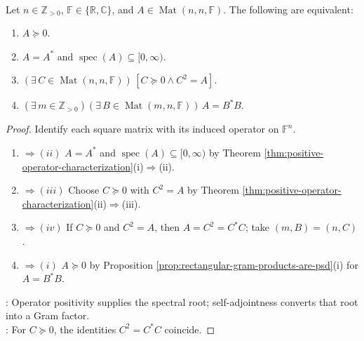 \begin{theorem} \label{thm:positive-semidefinite-matrix-equivalences} \\
Let $n\in\mathbb{Z}_{>0}$, $\mathbb{F}\in\{\mathbb{R},\mathbb{C}\}$, and $A\in\operatorname{Mat}(n,n,\mathbb{F})$. The following are equivalent:
\begin{enumerate}[label=(\roman*)]
\setlength{\itemsep}{0pt}
\item $A\succeq0$.
\item $A=A^*$ and $\operatorname{spec}(A)\subseteq[0,\infty)$.
\item $(\exists\,C\in\operatorname{Mat}(n,n,\mathbb{F}))\,[C\succeq0\land C^2=A]$.
\item $(\exists\,m\in\mathbb{Z}_{>0})(\exists\,B\in\operatorname{Mat}(m,n,\mathbb{F}))\,A=B^*B$.
\end{enumerate}
\begin{proof}
Identify each square matrix with its induced operator on $\mathbb{F}^n$.
\begin{enumerate}[label=(\roman*)]
\setlength{\itemsep}{0pt}
\item[$(i)$]$\Rightarrow (ii)$ $A=A^*$ and $\operatorname{spec}(A)\subseteq[0,\infty)$ by Theorem \ref{thm:positive-operator-characterization}(i)$\Rightarrow$(ii). \item[$(ii)$]$\Rightarrow (iii)$ Choose $C\succeq0$ with $C^2=A$ by Theorem \ref{thm:positive-operator-characterization}(ii)$\Rightarrow$(iii). \item[$(iii)$]$\Rightarrow (iv)$ If $C\succeq0$ and $C^2=A$, then $A=C^2=C^*C$; take $(m,B)=(n,C)$. \item[$(iv)$]$\Rightarrow (i)$ $A\succeq0$ by Proposition \ref{prop:rectangular-gram-products-are-psd}(i) for $A=B^*B$.
\end{enumerate}
: Operator positivity supplies the spectral root; self-adjointness converts that root into a Gram factor.\\
: For $C\succeq0$, the identities $C^2=C^*C$ coincide.
\end{proof}
\end{theorem}

